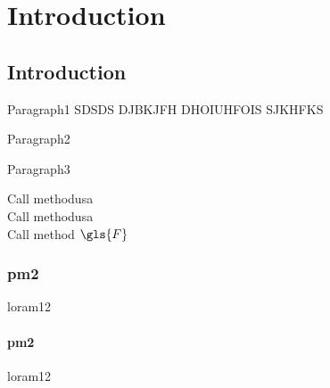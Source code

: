 
\chapter{Introduction} %

\label{c1} %
\lipsum[124]

\section{Introduction}
\par Paragraph1
SDSDS DJBKJFH DHOIUHFOIS SJKHFKS \cite{drewil2022air}
\par Paragraph2
\par Paragraph3







Call method\ac{usa}\\
Call method\ac{usa}\\

Call method $\gls{F}$

\subsection{pm2}
loram12
\subsubsection{pm2}
loram12